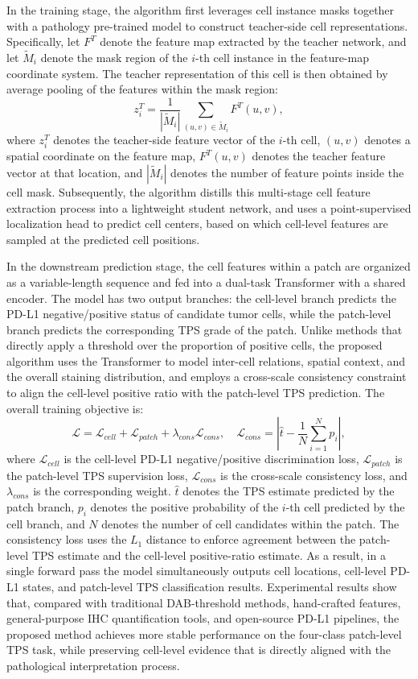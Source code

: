 \documentclass[journal]{vgtc}                     %
\begin{document}
In the training stage, the algorithm first leverages cell instance masks together with a pathology pre-trained model to construct teacher-side cell representations. Specifically, let $F^T$ denote the feature map extracted by the teacher network, and let $\tilde{M}_i$ denote the mask region of the $i$-th cell instance in the feature-map coordinate system. The teacher representation of this cell is then obtained by average pooling of the features within the mask region:
$$z_i^T = \frac{1}{|\tilde{M}_i|} \sum_{(u,v)\in \tilde{M}_i} F^T(u,v),$$
where $z_i^T$ denotes the teacher-side feature vector of the $i$-th cell, $(u,v)$ denotes a spatial coordinate on the feature map, $F^T(u,v)$ denotes the teacher feature vector at that location, and $|\tilde{M}_i|$ denotes the number of feature points inside the cell mask. Subsequently, the algorithm distills this multi-stage cell feature extraction process into a lightweight student network, and uses a point-supervised localization head to predict cell centers, based on which cell-level features are sampled at the predicted cell positions.

In the downstream prediction stage, the cell features within a patch are organized as a variable-length sequence and fed into a dual-task Transformer with a shared encoder. The model has two output branches: the cell-level branch predicts the PD-L1 negative/positive status of candidate tumor cells, while the patch-level branch predicts the corresponding TPS grade of the patch. Unlike methods that directly apply a threshold over the proportion of positive cells, the proposed algorithm uses the Transformer to model inter-cell relations, spatial context, and the overall staining distribution, and employs a cross-scale consistency constraint to align the cell-level positive ratio with the patch-level TPS prediction. The overall training objective is:
$$\mathcal{L} = \mathcal{L}_{cell} + \mathcal{L}_{patch} + \lambda_{cons}\mathcal{L}_{cons}, \quad \mathcal{L}_{cons} = \left| \hat{t} - \frac{1}{N}\sum_{i=1}^{N} p_i \right|,$$
where $\mathcal{L}_{cell}$ is the cell-level PD-L1 negative/positive discrimination loss, $\mathcal{L}_{patch}$ is the patch-level TPS supervision loss, $\mathcal{L}_{cons}$ is the cross-scale consistency loss, and $\lambda_{cons}$ is the corresponding weight. $\hat{t}$ denotes the TPS estimate predicted by the patch branch, $p_i$ denotes the positive probability of the $i$-th cell predicted by the cell branch, and $N$ denotes the number of cell candidates within the patch. The consistency loss uses the $L_1$ distance to enforce agreement between the patch-level TPS estimate and the cell-level positive-ratio estimate. As a result, in a single forward pass the model simultaneously outputs cell locations, cell-level PD-L1 states, and patch-level TPS classification results. Experimental results show that, compared with traditional DAB-threshold methods, hand-crafted features, general-purpose IHC quantification tools, and open-source PD-L1 pipelines, the proposed method achieves more stable performance on the four-class patch-level TPS task, while preserving cell-level evidence that is directly aligned with the pathological interpretation process.
\end{document}
